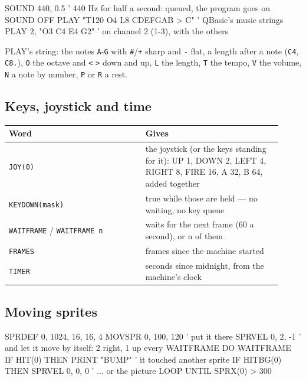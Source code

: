 \begin{type}
SOUND 440, 0.5                    ' 440 Hz for half a second: queued, the program goes on
SOUND OFF
PLAY "T120 O4 L8 CDEFGAB > C"     ' QBasic's music strings
PLAY 2, "O3 C4 E4 G2"             ' on channel 2 (1-3), with the others
\end{type}

PLAY's string: the notes \verb|A|-\verb|G| with \verb|#|/\verb|+| sharp and \verb|-| flat, a
length after a note (\verb|C4|, \verb|C8.|), \verb|O| the octave and \verb|<| \verb|>| down and up,
\verb|L| the length, \verb|T| the tempo, \verb|V| the volume, \verb|N| a note by number, \verb|P|
or \verb|R| a rest.

\subsection{Keys, joystick and time}

\begin{center}
\small
\begin{tabular}{@{}>{\raggedright\arraybackslash}p{0.46\linewidth} >{\raggedright\arraybackslash}p{0.46\linewidth}@{}}
\toprule
\textbf{Word} & \textbf{Gives} \\
\midrule
\verb|JOY(0)| & the joystick (or the keys standing for it): UP 1, DOWN 2, LEFT 4, RIGHT 8, FIRE 16, A 32, B 64, added together \\
\verb|KEYDOWN(mask)| & true while those are held --- no waiting, no key queue \\
\verb|WAITFRAME| / \texttt{WAITFRAME n} & waits for the next frame (60 a second), or n of them \\
\verb|FRAMES| & frames since the machine started \\
\verb|TIMER| & seconds since midnight, from the machine's clock \\
\bottomrule
\end{tabular}
\end{center}

\subsection{Moving sprites}

\begin{type}
SPRDEF 0, 1024, 16, 16, 4
MOVSPR 0, 100, 120         ' put it there
SPRVEL 0, 2, -1            ' and let it move by itself: 2 right, 1 up every WAITFRAME
DO
  WAITFRAME
  IF HIT(0) THEN PRINT "BUMP"      ' it touched another sprite
  IF HITBG(0) THEN SPRVEL 0, 0, 0  ' ... or the picture
LOOP UNTIL SPRX(0) > 300
\end{type}

